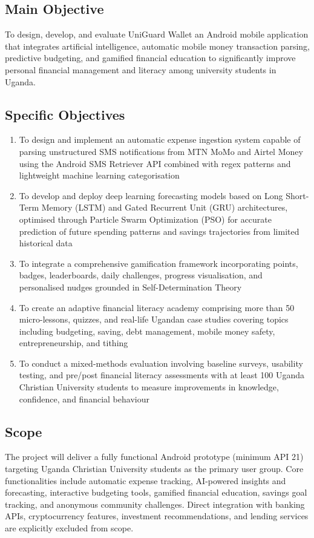 \documentclass[12pt]{article}
\begin{document}
\subsection{\large Main Objective}
To design, develop, and evaluate UniGuard Wallet an Android mobile application that integrates artificial intelligence, automatic mobile money transaction parsing, predictive budgeting, and gamified financial education to significantly improve personal financial management and literacy among university students in Uganda.

\subsection{\large Specific Objectives}
\begin{enumerate}[label=\arabic*.]
    \item To design and implement an automatic expense ingestion system capable of parsing unstructured SMS notifications from MTN MoMo and Airtel Money using the Android SMS Retriever API combined with regex patterns and lightweight machine learning categorisation
    \item To develop and deploy deep learning forecasting models based on Long Short-Term Memory (LSTM) and Gated Recurrent Unit (GRU) architectures, optimised through Particle Swarm Optimization (PSO) for accurate prediction of future spending patterns and savings trajectories from limited historical data
    \item To integrate a comprehensive gamification framework incorporating points, badges, leaderboards, daily challenges, progress visualisation, and personalised nudges grounded in Self-Determination Theory
    \item To create an adaptive financial literacy academy comprising more than 50 micro-lessons, quizzes, and real-life Ugandan case studies covering topics including budgeting, saving, debt management, mobile money safety, entrepreneurship, and tithing
    \item To conduct a mixed-methods evaluation involving baseline surveys, usability testing, and pre/post financial literacy assessments with at least 100 Uganda Christian University students to measure improvements in knowledge, confidence, and financial behaviour
\end{enumerate}

\subsection{\large Scope}
The project will deliver a fully functional Android prototype (minimum API 21) targeting Uganda Christian University students as the primary user group. Core functionalities include automatic expense tracking, AI-powered insights and forecasting, interactive budgeting tools, gamified financial education, savings goal tracking, and anonymous community challenges. Direct integration with banking APIs, cryptocurrency features, investment recommendations, and lending services are explicitly excluded from scope.
\end{document}
